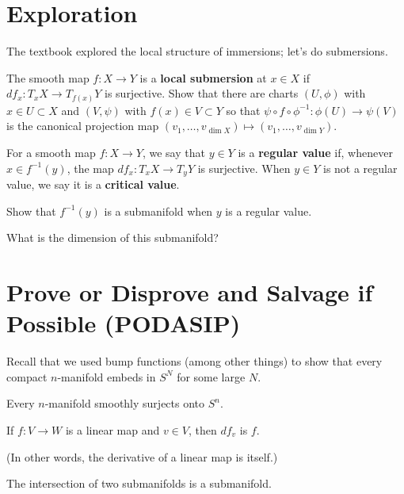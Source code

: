\documentclass{homework}
\begin{document}
\section{Exploration}

\begin{problem}
  The textbook explored the local structure of immersions; let's do submersions.
  
  The smooth map $f : X \to Y$ is a \textbf{local submersion} at
  $x \in X$ if $df_x : T_x X \to T_{f(x)} Y$ is surjective.  Show that
  there are charts $(U,\phi)$ with $x \in U \subset X$ and $(V,\psi)$
  with $f(x) \in V \subset Y$ so that
  $\psi \circ f \circ \phi^{-1} : \phi(U) \to \psi(V)$ is the
  canonical projection map
  $(v_1,\ldots,v_{\dim X}) \mapsto (v_1,\ldots,v_{\dim Y})$.
\end{problem}

\begin{problem}
  For a smooth map $f : X \to Y$, we say that $y \in Y$ is a
  \textbf{regular value} if, whenever $x \in f^{-1}(y)$, the map
  $df_x : T_x X \to T_y Y$ is surjective.  When $y \in Y$ is not a
  regular value, we say it is a \textbf{critical value}.

  Show that $f^{-1}(y)$ is a submanifold when $y$ is a regular value.

  What is the dimension of this submanifold?
\end{problem}


\section{Prove or Disprove and Salvage if Possible (PODASIP)}

Recall that we used bump functions (among other things) to show that
every compact $n$-manifold embeds in $S^N$ for some large $N$.

\begin{problem}
  Every $n$-manifold smoothly surjects onto $S^n$.
\end{problem}

\begin{problem}
  If $f : V \to W$ is a linear map and $v \in V$, then $df_v$ is $f$.

  (In other words, the derivative of a linear map is itself.)
\end{problem}

\begin{problem}
  The intersection of two submanifolds is a submanifold.
\end{problem}
\end{document}
